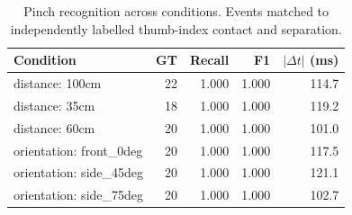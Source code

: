 \begin{table}[t]
\centering
\small
\caption{Pinch recognition across conditions. Events matched to independently labelled thumb-index contact and separation.}
\label{tab:pinch_conditions}
\begin{tabular}{lrrrr}
\hline
Condition & GT & Recall & F1 & $|\Delta t|$ (ms) \\
\hline
distance: 100cm & 22 & 1.000 & 1.000 & 114.7 \\
distance: 35cm & 18 & 1.000 & 1.000 & 119.2 \\
distance: 60cm & 20 & 1.000 & 1.000 & 101.0 \\
orientation: front\_0deg & 20 & 1.000 & 1.000 & 117.5 \\
orientation: side\_45deg & 20 & 1.000 & 1.000 & 121.1 \\
orientation: side\_75deg & 20 & 1.000 & 1.000 & 102.7 \\
\hline
\end{tabular}
\end{table}
